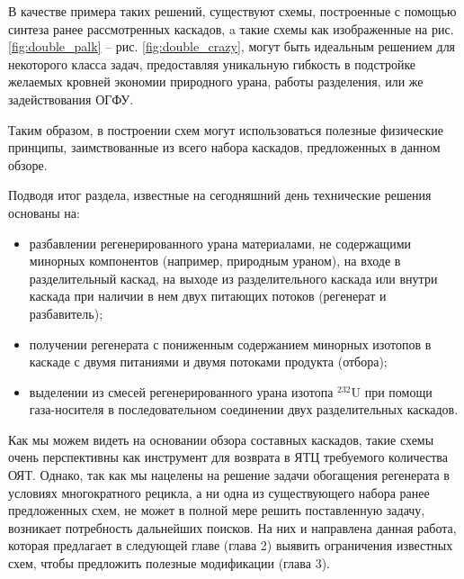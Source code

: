 В качестве примера таких решений, существуют схемы, построенные с помощью синтеза ранее рассмотренных каскадов, a такие схемы как изображенные на рис. \ref{fig:double_palk} -- рис. \ref{fig:double_crazy}, могут быть идеальным решением для некоторого класса задач, предоставляя уникальную гибкость в подстройке желаемых кровней экономии природного урана, работы разделения, или же задействования ОГФУ.

Таким образом, в построении схем могут использоваться полезные физические принципы, заимствованные из всего набора каскадов, предложенных в данном обзоре.

Подводя итог раздела, известные на сегодняшний день технические решения основаны на:
\begin{itemize}
  \item разбавлении регенерированного урана материалами, не содержащими минорных компонентов (например, природным ураном), на входе в разделительный каскад, на выходе из разделительного каскада или внутри каскада при наличии в нем двух питающих потоков (регенерат и разбавитель);
  \item получении регенерата с пониженным содержанием минорных изотопов в каскаде с двумя питаниями и двумя потоками продукта (отбора);
  \item выделении из смесей регенерированного урана изотопа $^{232}$U при помощи газа-носителя в последовательном соединении двух разделительных каскадов.
\end{itemize}

Как мы можем видеть на основании обзора составных каскадов, такие схемы очень перспективны как инструмент для возврата в ЯТЦ требуемого количества ОЯТ. Однако, 
так как мы нацелены на решение задачи обогащения регенерата в условиях многократного рецикла, а ни одна из существующего набора ранее предложенных схем, не может в полной мере решить поставленную задачу, возникает потребность дальнейших поисков. На них и направлена данная работа, которая предлагает в следующей главе (глава 2) выявить ограничения известных схем, чтобы предложить полезные модификации (глава 3).

